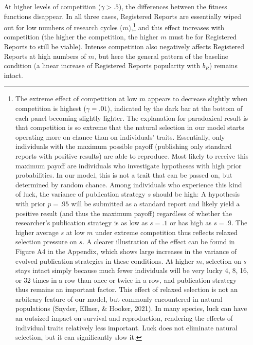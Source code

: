 \documentclass[
  british,
  a4paper,
  ,man,mask,floatsintext]{apa6}
\begin{document}
At higher levels of competition (\(\gamma > .5\)), the differences between the fitness functions disappear.
In all three cases, Registered Reports are essentially wiped out for low numbers of research cycles (\(m\)),\footnote{The extreme effect of competition at low \(m\) appears to decrease slightly when competition is highest (\(\gamma = .01\)), indicated by the dark bar at the bottom of each panel becoming slightly lighter.
  The explanation for paradoxical result is that
  competition is so extreme that the natural selection in our model starts operating more on chance than on individuals' traits.
  Essentially, only individuals with the maximum possible payoff (publishing only standard reports with positive results) are able to reproduce.
  Most likely to receive this maximum payoff are individuals who investigate hypotheses with high prior probabilities.
  In our model, this is not a trait that can be passed on, but determined by random chance.
  Among individuals who experience this kind of luck, the variance of publication strategy \(s\) should be high:
  A hypothesis with prior \(p = .95\) will be submitted as a standard report and likely yield a positive result (and thus the maximum payoff) regardless of whether the researcher's publication strategy is as low as \(s = .1\) or has high as \(s = .9\).
  The higher average \(s\) at low \(m\) under extreme competition thus reflects relaxed selection pressure on \(s\).
  A clearer illustration of the effect can be found in Figure A4 in the Appendix, which shows large increases in the variance of evolved publication strategies in these conditions.
  At higher \(m\), selection on \(s\) stays intact simply because much fewer individuals will be very lucky 4, 8, 16, or 32 times in a row than once or twice in a row, and publication strategy thus remains an important factor.
  This effect of relaxed selection is not an arbitrary feature of our model, but commonly encountered in natural populations (Snyder, Ellner, \& Hooker, 2021).
  In many species, luck can have an outsized impact on survival and reproduction, rendering the effects of individual traits relatively less important.
  Luck does not eliminate natural selection, but it can significantly slow it.
} and this effect increases with competition (the higher the competition, the higher \(m\) must be for Registered Reports to still be viable).
Intense competition also negatively affects Registered Reports at high numbers of \(m\), but here the general pattern of the baseline condition (a linear increase of Registered Reports popularity with \(b_{R}\)) remains intact.
\end{document}
